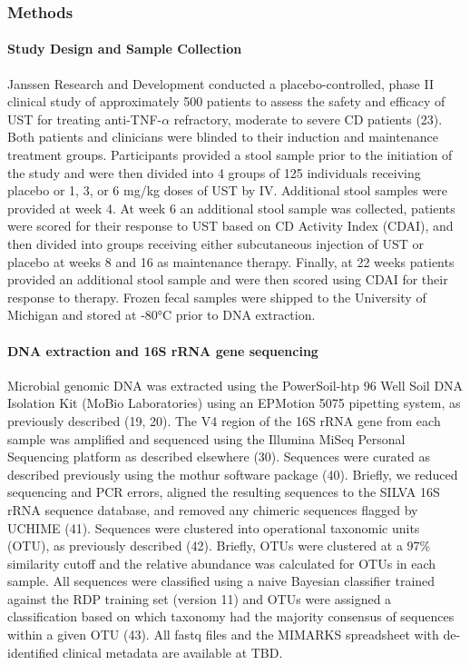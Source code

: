 \documentclass[11pt,]{article}
\let\oldparagraph\paragraph
\renewcommand{\paragraph}[1]{\oldparagraph{#1}\mbox{}}
\begin{document}
\newpage

\subsubsection{Methods}\label{methods}

\paragraph{Study Design and Sample
Collection}\label{study-design-and-sample-collection}

Janssen Research and Development conducted a placebo-controlled, phase
II clinical study of approximately 500 patients to assess the safety and
efficacy of UST for treating anti-TNF-\({\alpha}\) refractory, moderate
to severe CD patients (23). Both patients and clinicians were blinded to
their induction and maintenance treatment groups. Participants provided
a stool sample prior to the initiation of the study and were then
divided into 4 groups of 125 individuals receiving placebo or 1, 3, or 6
mg/kg doses of UST by IV. Additional stool samples were provided at week
4. At week 6 an additional stool sample was collected, patients were
scored for their response to UST based on CD Activity Index (CDAI), and
then divided into groups receiving either subcutaneous injection of UST
or placebo at weeks 8 and 16 as maintenance therapy. Finally, at 22
weeks patients provided an additional stool sample and were then scored
using CDAI for their response to therapy. Frozen fecal samples were
shipped to the University of Michigan and stored at -80°C prior to DNA
extraction.

\paragraph{DNA extraction and 16S rRNA gene
sequencing}\label{dna-extraction-and-16s-rrna-gene-sequencing}

Microbial genomic DNA was extracted using the PowerSoil-htp 96 Well Soil
DNA Isolation Kit (MoBio Laboratories) using an EPMotion 5075 pipetting
system, as previously described (19, 20). The V4 region of the 16S rRNA
gene from each sample was amplified and sequenced using the Illumina
MiSeq Personal Sequencing platform as described elsewhere (30).
Sequences were curated as described previously using the mothur software
package (40). Briefly, we reduced sequencing and PCR errors, aligned the
resulting sequences to the SILVA 16S rRNA sequence database, and removed
any chimeric sequences flagged by UCHIME (41). Sequences were clustered
into operational taxonomic units (OTU), as previously described (42).
Briefly, OTUs were clustered at a 97\% similarity cutoff and the
relative abundance was calculated for OTUs in each sample. All sequences
were classified using a naive Bayesian classifier trained against the
RDP training set (version 11) and OTUs were assigned a classification
based on which taxonomy had the majority consensus of sequences within a
given OTU (43). All fastq files and the MIMARKS spreadsheet with
de-identified clinical metadata are available at TBD.
\end{document}
